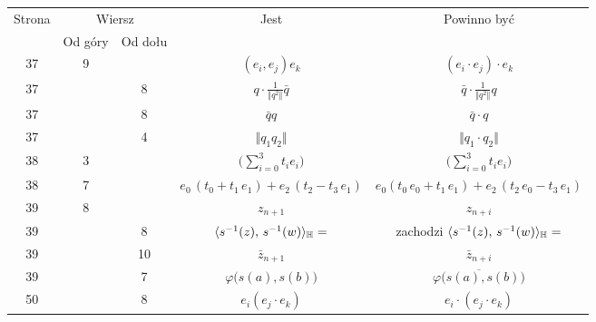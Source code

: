 \documentclass[a4paper,11pt]{article}
\begin{document}
\begin{center}
  \begin{tabular}{|c|c|c|c|c|}
    \hline
    Strona & \multicolumn{2}{c|}{Wiersz} & Jest
    & Powinno być \\ \cline{2-3}
           & Od góry & Od dołu & & \\
    \hline
    37  &  9 & & $( e_{ i }, e_{ j } ) e_{ k }$
           & $( e_{ i } \cdot e_{ j } ) \cdot e_{ k }$ \\
    37  & &  8 & $q \cdot \frac{ 1 }{ \Vert q^{ 2 } \Vert } \bar{q}$
           & $\bar{q} \cdot \frac{ 1 }{ \Vert q^{ 2 } \Vert } q$ \\
    37  & &  8 & $\bar{q} q$ & $\bar{q} \cdot q$ \\
    37  & &  4 & $\Vert q_{ 1 } q_{ 2 } \Vert$ & $\Vert q_{ 1 } \cdot q_{ 2 } \Vert$ \\
    38  &  3 & & $\displaystyle \big( \sum_{ i = 0 }^{ 3 } t_{ i } e_{ i } )$
           & $\displaystyle \big( \sum_{ i = 0 }^{ 3 } t_{ i } e _{ i } \big)$ \\
    38  &  7 & & $e_{ 0 } \, ( t_{ 0 } + t_{ 1 } \, e_{ 1 } )
                 + e_{ 2 } \, ( t_{ 2 } - t_{ 3 } \, e_{ 1 } )$
           & $e_{ 0 } ( t_{ 0 } \, e_{ 0 } + t_{ 1 } \, e_{ 1 } )
             + e_{ 2 } \, ( t_{ 2 } \, e_{ 0 } - t_{ 3 } \, e_{ 1 } )$ \\
    39  &  8 & & $z_{ n + 1 }$ & $z_{ n + i }$ \\
    39  & &  8 & $\langle s^{ -1 }( z ), \, s^{ -1 }( w ) \rangle_{ \mathbb{H} } =$
           & zachodzi $\langle s^{ -1 }( z ), \, s^{ -1 }( w ) \rangle_{ \mathbb{H} } =$ \\
    39  & & 10 & $\bar{z}_{ n + 1 }$ & $\bar{z}_{ n + i }$ \\
    39  & &  7 & $\varphi\big( s( a ), s( b ) \big)$
           & $\overline{ \varphi\big( s( a ), s( b ) \big) }$ \\
    50  & &  8 & $e_{ i } ( e_{ j } \cdot e_{ k } )$
           & $e_{ i } \cdot ( e_{ j } \cdot e_{ k } )$ \\
    \hline
  \end{tabular}






\end{center}
\end{document}
